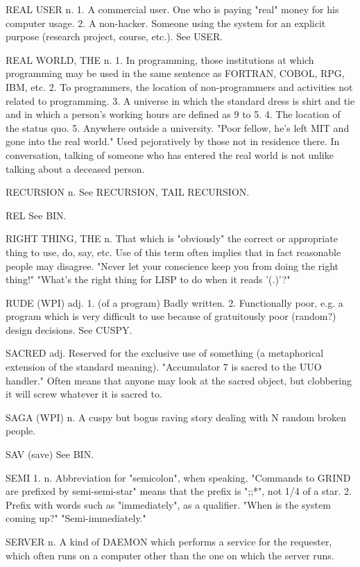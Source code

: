 REAL USER n. 1. A commercial user.  One who is paying "real" money for
   his computer usage.	2. A non-hacker.  Someone using the system for
   an explicit purpose (research project, course, etc.).  See USER.

REAL WORLD, THE n. 1. In programming, those institutions at which
   programming may be used in the same sentence as FORTRAN, COBOL,
   RPG, IBM, etc.  2. To programmers, the location of non-programmers
   and activities not related to programming.  3. A universe in which
   the standard dress is shirt and tie and in which a person's working
   hours are defined as 9 to 5.	 4. The location of the status quo.
   5. Anywhere outside a university.  "Poor fellow, he's left MIT and
   gone into the real world."  Used pejoratively by those not in
   residence there.  In conversation, talking of someone who has
   entered the real world is not unlike talking about a deceased
   person.

RECURSION n. See RECURSION, TAIL RECURSION.

REL  See BIN.

RIGHT THING, THE n. That which is "obviously" the correct or
   appropriate thing to use, do, say, etc.  Use of this term often
   implies that in fact reasonable people may disagree.	 "Never let
   your conscience keep you from doing the right thing!"  "What's the
   right thing for LISP to do when it reads '(.)'?"

RUDE (WPI) adj. 1. (of a program) Badly written.  2. Functionally
   poor, e.g. a program which is very difficult to use because of
   gratuitously poor (random?) design decisions.  See CUSPY.

SACRED adj. Reserved for the exclusive use of something (a
   metaphorical extension of the standard meaning).  "Accumulator 7 is
   sacred to the UUO handler."	Often means that anyone may look at
   the sacred object, but clobbering it will screw whatever it is
   sacred to.

SAGA (WPI) n. A cuspy but bogus raving story dealing with N random
   broken people.

SAV (save)  See BIN.

SEMI 1. n. Abbreviation for "semicolon", when speaking.	 "Commands to
   GRIND are prefixed by semi-semi-star" means that the prefix is
   ";;*", not 1/4 of a star.  2. Prefix with words such as
   "immediately", as a qualifier.  "When is the system coming up?"
   "Semi-immediately."

SERVER n. A kind of DAEMON which performs a service for the requester,
   which often runs on a computer other than the one on which the
   server runs.


